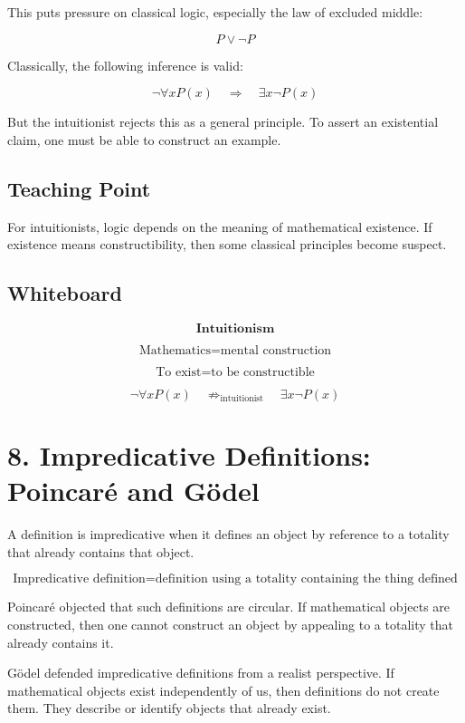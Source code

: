 \documentclass[11pt]{article}
\begin{document}
This puts pressure on classical logic, especially the law of excluded middle:

\[
P \lor \neg P
\]

Classically, the following inference is valid:

\[
\neg \forall x P(x)
\quad \Rightarrow \quad
\exists x \neg P(x)
\]

But the intuitionist rejects this as a general principle. To assert an existential claim, one
must be able to construct an example.

\subsection*{Teaching Point}

For intuitionists, logic depends on the meaning of mathematical existence. If existence
means constructibility, then some classical principles become suspect.

\subsection*{Whiteboard}

\[
\textbf{Intuitionism}
\]

\[
\text{Mathematics} = \text{mental construction}
\]

\[
\text{To exist} = \text{to be constructible}
\]

\[
\neg \forall x P(x)
\quad \not\Rightarrow_{\text{intuitionist}} \quad
\exists x \neg P(x)
\]

\section*{8. Impredicative Definitions: Poincar\'e and G\"odel}

A definition is impredicative when it defines an object by reference to a totality that already
contains that object.

\[
\text{Impredicative definition}
=
\text{definition using a totality containing the thing defined}
\]

Poincar\'e objected that such definitions are circular. If mathematical objects are
constructed, then one cannot construct an object by appealing to a totality that already
contains it.

G\"odel defended impredicative definitions from a realist perspective. If mathematical
objects exist independently of us, then definitions do not create them. They describe or
identify objects that already exist.
\end{document}
